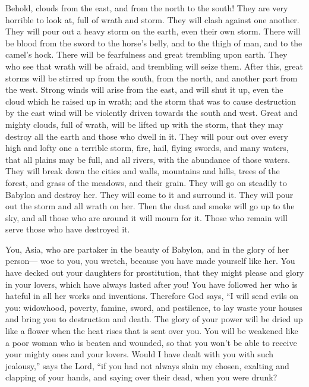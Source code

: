  Behold, clouds from the east, and from the north to the
south! They are very horrible to look at, full of wrath and storm.
 They will clash against one another. They will pour out a
heavy storm on the earth, even their own storm. There will be blood from
the sword to the horse's belly,  and to the thigh of man,
and to the camel's hock.  There will be fearfulness and
great trembling upon earth. They who see that wrath will be afraid, and
trembling will seize them.  After this, great storms will
be stirred up from the south, from the north, and another part from the
west.  Strong winds will arise from the east, and will shut
it up, even the cloud which he raised up in wrath; and the storm that
was to cause destruction by the east wind will be violently driven
towards the south and west.  Great and mighty clouds, full
of wrath, will be lifted up with the storm, that they may destroy all
the earth and those who dwell in it. They will pour out over every high
and lofty one a terrible storm,  fire, hail, flying swords,
and many waters, that all plains may be full, and all rivers, with the
abundance of those waters.  They will break down the cities
and walls, mountains and hills, trees of the forest, and grass of the
meadows, and their grain.  They will go on steadily to
Babylon and destroy her.  They will come to it and surround
it. They will pour out the storm and all wrath on her. Then the dust and
smoke will go up to the sky, and all those who are around it will mourn
for it.  Those who remain will serve those who have
destroyed it.

 You, Asia, who are partaker in the beauty of Babylon, and
in the glory of her person---  woe to you, you wretch,
because you have made yourself like her. You have decked out your
daughters for prostitution, that they might please and glory in your
lovers, which have always lusted after you!  You have
followed her who is hateful in all her works and inventions. Therefore
God says,  ``I will send evils on you: widowhood, poverty,
famine, sword, and pestilence, to lay waste your houses and bring you to
destruction and death.  The glory of your power will be
dried up like a flower when the heat rises that is sent over you.
 You will be weakened like a poor woman who is beaten and
wounded, so that you won't be able to receive your mighty ones and your
lovers.  Would I have dealt with you with such jealousy,''
says the Lord,  ``if you had not always slain my chosen,
exalting and clapping of your hands, and saying over their dead, when
you were drunk?

